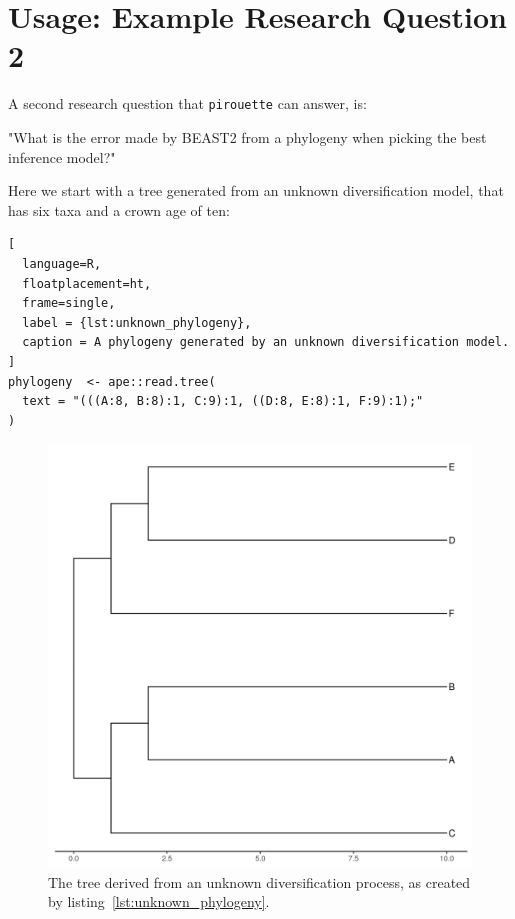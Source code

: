 \documentclass{article}
\begin{document}
\section{Usage: Example Research Question 2}

A second research question that \verb;pirouette; can answer, is:

"What is the error made by BEAST2 from a phylogeny when
picking the best inference model?"

Here we start with a tree generated from an unknown 
diversification model, that has six taxa and a crown age of ten:

\begin{lstlisting}[
  language=R, 
  floatplacement=ht, 
  frame=single, 
  label = {lst:unknown_phylogeny},
  caption = A phylogeny generated by an unknown diversification model.
]
phylogeny  <- ape::read.tree(
  text = "(((A:8, B:8):1, C:9):1, ((D:8, E:8):1, F:9):1);"
)
\end{lstlisting}
\begin{figure}[ht]
  \includegraphics[width=\textwidth]{tree_unknown.png}
  \caption{The tree derived from an unknown diversification process, 
    as created by listing~\ref{lst:unknown_phylogeny}.
  }
\end{figure}
\end{document}
